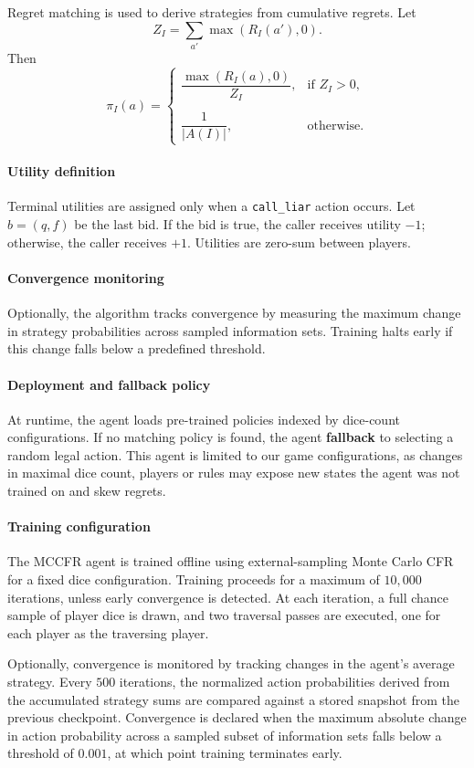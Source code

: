 Regret matching is used to derive strategies from cumulative regrets. Let
\[
Z_I = \sum_{a'} \max(R_I(a'), 0).
\]
Then
\[
\pi_I(a) =
\begin{cases}
\dfrac{\max(R_I(a), 0)}{Z_I}, & \text{if } Z_I > 0, \\ \\
\dfrac{1}{|A(I)|}, & \text{otherwise}.
\end{cases}
\]

\paragraph{Utility definition}
Terminal utilities are assigned only when a \texttt{call\_liar} action occurs. Let \( b = (q,f) \) be the last bid. If the bid is true, the caller receives utility \(-1\); otherwise, the caller receives \(+1\). Utilities are zero-sum between players.

\paragraph{Convergence monitoring}
Optionally, the algorithm tracks convergence by measuring the maximum change in strategy probabilities across sampled information sets. Training halts early if this change falls below a predefined threshold.

\paragraph{Deployment and fallback policy}
At runtime, the agent loads pre-trained policies indexed by dice-count configurations. If no matching policy is found, the agent \textbf{fallback} to selecting a random legal action. This agent is limited to our game configurations, as changes in maximal dice count, players or rules may expose new states the agent was not trained on and skew regrets.

\paragraph{Training configuration}
The MCCFR agent is trained offline using external-sampling Monte Carlo CFR for a fixed dice configuration. Training proceeds for a maximum of $10{,}000$ iterations, unless early convergence is detected. At each iteration, a full chance sample of player dice is drawn, and two traversal passes are executed, one for each player as the traversing player.

Optionally, convergence is monitored by tracking changes in the agent’s average strategy. Every $500$ iterations, the normalized action probabilities derived from the accumulated strategy sums are compared against a stored snapshot from the previous checkpoint. Convergence is declared when the maximum absolute change in action probability across a sampled subset of information sets falls below a threshold of $0.001$, at which point training terminates early.

